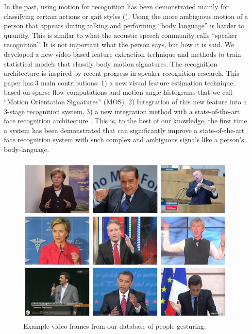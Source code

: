 \documentclass[times, 10pt,twocolumn]{article}
\begin{document}
In the past, using motion for recognition has been demonstrated mainly for classifying certain actions or gait styles (\cite{laptevCVPR08,niebles2008unsupervised,efros2003recognizing,DollarPETS05,sarkar2005humanid}).  Using the more ambiguous motion of a person that appears during talking and performing ``body language''  is harder to quantify.  This is similar to what the acoustic speech community calls ``speaker recognition''.  It is not important what the person says, but how it is said.  We developed a new video-based feature extraction technique and methods to train statistical models that classify body motion signatures.  The recognition architecture is inspired by recent progress in speaker recognition research.  
This paper has 3 main contributions: 1) a new visual feature estimation technique,  based on sparse flow computations and motion angle histograms that we call  ``Motion Orientation Signatures'' (MOS).  2) Integration of this new feature into a 3-stage recognition system, 3) a new integration method with a state-of-the-art face recognition architecture \cite{pittpatt}.  This is, to the best of our knowledge, the first time a system has been demonstrated that can significantly improve a state-of-the-art face recognition system with such complex and ambiguous signals like a person's body-language.


\begin{figure}[bt]
\centering
\includegraphics[width=0.96\columnwidth]{matrix_3x3}
\caption{\label{fig_examples}\small Example video frames from our database of people gesturing.
}
\end{figure}
\end{document}
